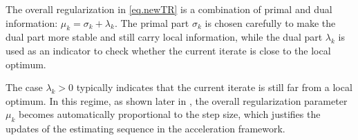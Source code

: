 \documentclass{article}
\begin{document}
\begin{subroutine}[!ht]
    \small
    \caption{Local Detection (LD) }\label{alg.local detection}
    \begin{algorithmic}[1]
        \label{line.if coro 3.1}
        \ENDIF
        \label{line.track 1 number of iter}
        \ENDIF
        \ENDFOR
        \ELSE
        \ENDIF
        \ENDIF
        \ENDWHILE
    \end{algorithmic}
    \normalsize
\end{subroutine}
The overall regularization in \ref{eq.newTR} is a combination of primal and dual information: $\mu_k = \sigma_k + \lambda_k$. The primal part $\sigma_k$ is chosen carefully to make the dual part more stable and still carry local information, while the dual part $\lambda_k$ is used as an indicator to check whether the current iterate is close to the local optimum.


The case $\lambda_k > 0$ typically indicates that the current iterate is still far from a local optimum. In this regime, as shown later in , the overall regularization parameter $\mu_k$ becomes automatically proportional to the step size, which justifies the updates of the estimating sequence in the acceleration framework.
\end{document}
